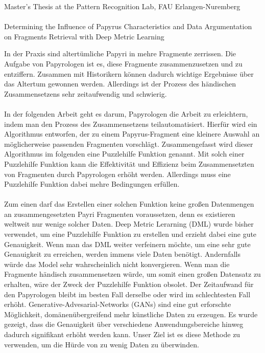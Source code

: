 \documentclass[12pt,a4paper]{article}
\begin{document}
\begin{center}
	Master's Thesis at the Pattern Recognition Lab, FAU Erlangen-Nuremberg \hfill \\[5mm]
																				
	\mbox{}\\
	{\Large Determining the Influence of Papyrus Characteristics and Data Argumentation on Fragments Retrieval with Deep Metric Learning}
			
\end{center}


In der Praxis sind altertümliche Papyri in mehre Fragmente zerrissen. 
Die Aufgabe von Papyrologen ist es, diese Fragmente zusammenzusetzen und zu entziffern. Zusammen mit Historikern können dadurch wichtige Ergebnisse über das Altertum gewonnen werden. Allerdings ist der Prozess des händischen Zusammensetzens sehr zeitaufwendig und schwierig. 
\\\\
In der folgenden Arbeit geht es darum, Papyrologen die Arbeit zu erleichtern, indem man den Prozess des Zusammensetzens teilautomatisiert. Hierfür wird ein Algorithmus entworfen, der zu einem Papyrus-Fragment eine kleinere Auswahl an möglicherweise passenden Fragmenten vorschlägt. Zusammengefasst wird dieser Algorithmus im folgenden eine Puzzlehilfe Funktion genannt. Mit solch einer Puzzlehilfe Funktion kann die Effektivität und Effizienz beim Zusammensetzten von Fragmenten durch Papyrologen erhöht werden. Allerdings muss eine Puzzlehilfe Funktion dabei mehre Bedingungen erfüllen.
\\\\
Zum einen darf das Erstellen einer solchen Funktion keine großen Datenmengen an zusammengesetzten Payri Fragmenten voraussetzen, denn es existieren weltweit nur wenige solcher Daten. Deep Metric Lerarning (DML) wurde bisher verwendet, um eine Puzzlehilfe Funktion zu erstellen und erzieht dabei eine gute Genauigkeit. Wenn man das DML weiter verfeinern möchte, um eine sehr gute Genauigkeit zu erreichen, werden immens viele Daten benötigt. Andernfalls würde das Model sehr wahrscheinlich nicht konvergieren. Wenn man die Fragmente händisch zusammensetzen würde, um somit einen großen Datensatz zu erhalten, wäre der Zweck der Puzzlehilfe Funktion obsolet. Der Zeitaufwand für den Papyrologen bleibt im besten Fall derselbe oder wird im schlechtesten Fall erhöht. Generative-Advesarial-Networks (GANs) sind eine gut erforschte Möglichkeit, domänenübergreifend mehr künstliche Daten zu erzeugen. Es wurde gezeigt, dass die Genauigkeit über verschiedene Anwendungsbereiche hinweg dadurch signifikant erhöht werden kann. Unser Ziel ist es diese Methode zu verwenden, um die Hürde von zu wenig Daten zu überwinden. 
\end{document}
